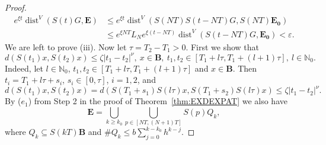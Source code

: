 \documentclass[a4paper,12pt,reqno]{amsart}
\theoremstyle{plain}
\theoremstyle{definition}
\numberwithin{equation}{section}
\newcommand{\N}{\mathbb{N}}
\newcommand{\abs}[1]{\left\vert#1\right\vert}
\newcommand{\eps}{\varepsilon}
\newcommand{\dist}{\operatorname{dist}}
\renewcommand{\geq}{\geqslant}
\renewcommand{\leq}{\leqslant}
\begin{document}
\begin{proof}
\begin{align*}
e^{\xi t}\dist^{V}(S(t)G,\mathbf{E})&\leq e^{\xi t}\dist^{V}(S(NT)S(t-NT)G,S(NT)\mathbf{E_0})\\
&\leq e^{\xi NT}L_{N}e^{\xi(t-NT)}\dist^{V}(S(t-NT)G,\mathbf{E_0})<\eps.
\end{align*}
We are left to prove (iii). Now let $\tau=T_2-T_1>0$. First we show that
\begin{equation}\label{e:HOLDERONSMALL}
d(S(t_1)x,S(t_2)x)\leq\zeta\abs{t_1-t_2}^{\nu},\ x\in \mathbf{B},\ t_1,t_2\in[T_1+l\tau,T_1+(l+1)\tau],\ l\in\N_0.
\end{equation}
Indeed, let $l\in\N_0$, $t_1,t_2\in[T_1+l\tau,T_1+(l+1)\tau]$ and $x\in\mathbf{B}$. Then $t_i=T_1+l\tau+s_i$, $s_i\in[0,\tau]$, $i=1,2$, and
$$d(S(t_1)x,S(t_2)x)=d(S(T_1+s_1)S(l\tau)x,S(T_1+s_2)S(l\tau)x)\leq\zeta\abs{t_1-t_2}^{\nu}.$$
By ($e_1$) from Step 2 in the proof of Theorem~\ref{thm:EXDEXPAT} we also have
$$\mathbf{E}=\bigcup_{k\geq k_0}\bigcup_{p\in[NT,(N+1)T]}S(p)Q_{k},$$
where $Q_k\subseteq S(kT)\mathbf{B}$ and $\displaystyle\# Q_k\leq b\sum_{j=0}^{k-k_0}h^{k-j}$.


\end{proof}
\end{document}
